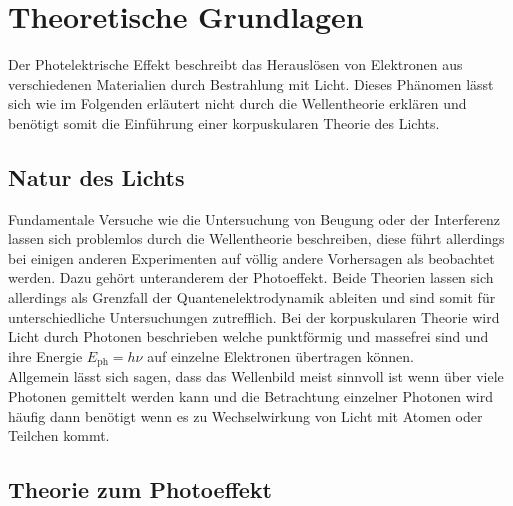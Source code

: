 \section{Theoretische Grundlagen}

Der Photelektrische Effekt beschreibt das Herauslösen von Elektronen aus verschiedenen Materialien durch Bestrahlung mit Licht. Dieses Phänomen lässt sich 
wie im Folgenden erläutert nicht durch die Wellentheorie erklären und benötigt somit die Einführung einer korpuskularen Theorie des Lichts.

\subsection{Natur des Lichts}

Fundamentale Versuche wie die Untersuchung von Beugung oder der Interferenz lassen sich problemlos durch die Wellentheorie beschreiben, diese führt allerdings bei einigen anderen Experimenten auf
völlig andere Vorhersagen als beobachtet werden. Dazu gehört unteranderem der Photoeffekt. Beide Theorien lassen sich allerdings als Grenzfall der Quantenelektrodynamik ableiten und sind somit für unterschiedliche 
Untersuchungen zutrefflich. Bei der korpuskularen Theorie wird Licht durch Photonen beschrieben welche punktförmig und massefrei sind und ihre Energie $E_{\text{ph}} = h\nu$ auf einzelne Elektronen übertragen können.
\\
Allgemein lässt sich sagen, dass das Wellenbild meist sinnvoll ist wenn über viele Photonen gemittelt werden kann und die Betrachtung einzelner Photonen wird häufig dann benötigt wenn es zu Wechselwirkung von Licht mit Atomen oder Teilchen kommt.

\subsection{Theorie zum Photoeffekt}

